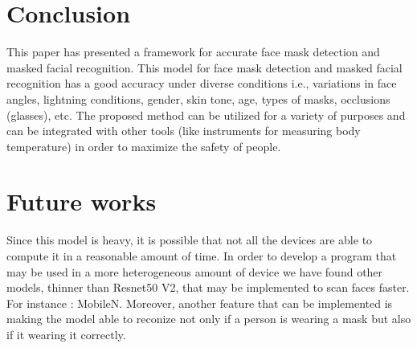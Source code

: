 \section{Conclusion} 

This paper has presented a framework for accurate face mask detection and masked facial recognition.
This model for face mask detection and masked facial recognition has a good accuracy under diverse conditions i.e., variations in face angles,
lightning conditions, gender, skin tone, age, types of masks, occlusions (glasses), etc. 
The proposed method can be utilized for a variety of purposes and can be integrated with other tools (like instruments for measuring body temperature) in order to maximize the safety of people. 

\section{Future works}
Since this model is heavy, it is possible that not all the devices are able to compute it in a reasonable amount of time. In order to develop a program that may be used in a more heterogeneous amount of device we have found other models, thinner than Resnet50 V2, that may be implemented to scan faces faster. For instance : MobileN.
Moreover, another feature that can be implemented is making the model able to reconize not only if a person is wearing a mask but also if it wearing it correctly.

